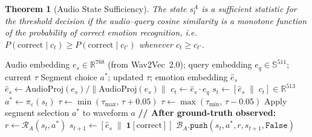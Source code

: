 \documentclass[12pt,a4paper]{article}
\theoremstyle{definition}
\theoremstyle{plain}
\newtheorem{theorem}{Theorem}[section]
\theoremstyle{remark}
\newcommand{\R}{\mathbb{R}}
\newcommand{\Sph}{\mathbb{S}}
\newcommand{\Norm}[1]{\left\|#1\right\|}
\begin{document}
\begin{theorem}[Audio State Sufficiency]
\label{thm:audio_state}
The state $s_t^A$ is a sufficient statistic for the threshold decision if the
audio--query cosine similarity is a monotone function of the probability of
correct emotion recognition, i.e.\ $P(\text{correct} \mid c_t) \ge
P(\text{correct} \mid c_{t'})$ whenever $c_t \ge c_{t'}$.
\end{theorem}

\begin{algorithm}[H]
\caption{RL-Audio Policy --- Inference and Feedback}
\label{alg:rl_audio}
\begin{algorithmic}[1]
\Require Audio embedding $e_s\in\R^{768}$ (from Wav2Vec~2.0);
         query embedding $e_q\in\Sph^{511}$; current $\tau$
\Ensure Segment choice $a^*$; updated $\tau$; emotion embedding $\hat{e}_s$
\State $\hat{e}_s \gets \mathrm{AudioProj}(e_s)/\Norm{\mathrm{AudioProj}(e_s)}$
\State $c_t \gets \hat{e}_s \cdot e_q$
\State $s_t \gets [\hat{e}_s \;\|\; c_t] \in \R^{513}$
\State $a^* \gets \pi_{\varepsilon}(s_t)$
  $\tau \gets \min(\tau_{\max},\,\tau + 0.05)$
  $\tau \gets \max(\tau_{\min},\,\tau - 0.05)$
\EndIf
\State Apply segment selection $a^*$ to waveform $a$
\State \textbf{// After ground-truth observed:}
\State $r \gets \mathcal{R}_A(s_t, a^*)$
\State $s_{t+1} \gets [\hat{e}_s \;\|\; \mathbf{1}[\text{correct}]]$
\State $\mathcal{B}_A.\texttt{push}(s_t,a^*,r,s_{t+1},\texttt{False})$
\State {}
\end{algorithmic}
\end{algorithm}
\end{document}
